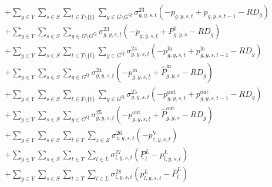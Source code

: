 \documentclass{article}
\newcommand{\sGenerators}{G}
\newcommand{\sStorage}{G^{\mathrm{Q}}}
\newcommand{\sYears}{Y}
\newcommand{\sScenarios}{S}
\newcommand{\sIntervals}{T}
\newcommand{\sZones}{Z}
\newcommand{\sLinks}{L}
\newcommand{\iGenerator}{g}
\newcommand{\iYear}{y}
\newcommand{\iScenario}{s}
\newcommand{\iInterval}{t}
\newcommand{\iIntervalTerminal}{\overline{\iInterval}}
\newcommand{\iIntervalStart}{\underline{\iInterval}}
\newcommand{\iZone}{z}
\newcommand{\iLink}{l}
\newcommand{\cRampRateDown}[1][\iGenerator]{RD_{#1}}
\newcommand{\cPowerFlowMin}{\underline{P}_{\iLink}^{L}}
\newcommand{\cPowerFlowMax}{\overline{P}_{\iLink}^{L}}
\newcommand{\cPowerInitial}[1][\iGenerator,\iYear,\iScenario]{P_{#1}^{0}}
\newcommand{\cPowerOutInitial}[1][\iGenerator,\iYear,\iScenario]{\hat{P}_{#1}^{\mathrm{out}}}
\newcommand{\cPowerInInitial}[1][\iGenerator,\iYear,\iScenario]{\hat{P}_{#1}^{\mathrm{in}}}
\newcommand{\vPower}[1][\iGenerator,\iYear,\iScenario,\iInterval]{p_{#1}}
\newcommand{\vPowerIn}[1][\iGenerator,\iYear,\iScenario,\iInterval]{p^{\mathrm{in}}_{#1}}
\newcommand{\vPowerOut}[1][\iGenerator,\iYear,\iScenario,\iInterval]{p^{\mathrm{out}}_{#1}}
\newcommand{\vPowerFlow}[1][\iLink,\iYear,\iScenario,\iInterval]{p^{\sLinks}_{#1}}
\newcommand{\vLostLoadPower}[1][\iZone,\iYear,\iScenario,\iInterval]{p^{\mathrm{V}}_{#1}}
\newcommand{\dRampRateDown}[1][\iGenerator,\iYear,\iScenario,\iInterval]{\sigma_{#1}^{23}}
\newcommand{\dRampRateDownStorageCharging}[1][\iGenerator,\iYear,\iScenario,\iInterval]{\sigma_{#1}^{24}}
\newcommand{\dRampRateDownStorageDischarging}[1][\iGenerator,\iYear,\iScenario,\iInterval]{\sigma_{#1}^{25}}
\newcommand{\dNonNegativeLostLoad}[1][\iZone,\iYear,\iScenario,\iInterval]{\sigma_{#1}^{26}}
\newcommand{\dMinPowerFlow}[1][\iLink,\iYear,\iScenario,\iInterval]{\sigma_{#1}^{27}}
\newcommand{\dMaxPowerFlow}[1][\iLink,\iYear,\iScenario,\iInterval]{\sigma_{#1}^{28}}
\begin{document}
\begin{align}
		& + \sum\limits_{\iYear \in \sYears}\sum\limits_{\iScenario \in \sScenarios}\sum\limits_{\iInterval \in \sIntervals \setminus \{\iIntervalStart\}} \sum\limits_{\iGenerator \in \sGenerators \setminus \sStorage} \dRampRateDown \left(- \vPower + \vPower[\iGenerator,\iYear,\iScenario,\iInterval-1] - \cRampRateDown\right)\\
		& + \sum\limits_{\iYear \in \sYears}\sum\limits_{\iScenario \in \sScenarios} \sum\limits_{\iGenerator \in \sGenerators \setminus \sStorage} \dRampRateDown[\iGenerator,\iYear,\iScenario,\iIntervalStart] \left(- \vPower[\iGenerator,\iYear,\iScenario,\iIntervalStart] + \cPowerInitial - \cRampRateDown\right)\\
		& +  \sum\limits_{\iYear \in \sYears}\sum\limits_{\iScenario \in \sScenarios} \sum\limits_{\iInterval \in \sIntervals \setminus \{\iIntervalTerminal\}} \sum\limits_{\iGenerator \in \sStorage} \dRampRateDownStorageCharging \left(- \vPowerIn + \vPowerIn[\iGenerator,\iYear,\iScenario,\iInterval-1] - \cRampRateDown\right) \\
		& +  \sum\limits_{\iYear \in \sYears}\sum\limits_{\iScenario \in \sScenarios} \sum\limits_{\iGenerator \in \sStorage} \dRampRateDownStorageCharging[\iGenerator,\iYear,\iScenario,\iIntervalStart] \left(- \vPowerIn[\iGenerator,\iYear,\iScenario,\iIntervalStart] + \cPowerInInitial - \cRampRateDown\right) \\
		& +  \sum\limits_{\iYear \in \sYears}\sum\limits_{\iScenario \in \sScenarios} \sum\limits_{\iInterval \in \sIntervals \setminus \{\iIntervalTerminal\}} \sum\limits_{\iGenerator \in \sStorage} \dRampRateDownStorageDischarging \left(- \vPowerOut + \vPowerOut[\iGenerator,\iYear,\iScenario,\iInterval-1] - \cRampRateDown\right) \\
		& +  \sum\limits_{\iYear \in \sYears}\sum\limits_{\iScenario \in \sScenarios} \sum\limits_{\iGenerator \in \sStorage} \dRampRateDownStorageDischarging[\iGenerator,\iYear,\iScenario,\iIntervalStart] \left(- \vPowerOut[\iGenerator,\iYear,\iScenario,\iIntervalStart] + \cPowerOutInitial - \cRampRateDown\right) \\
		& + \sum\limits_{\iYear \in \sYears}\sum\limits_{\iScenario \in \sScenarios}\sum\limits_{\iInterval \in \sIntervals} \sum\limits_{\iZone \in \sZones} \dNonNegativeLostLoad \left(- \vLostLoadPower\right)\\
		& + \sum\limits_{\iYear \in \sYears}\sum\limits_{\iScenario \in \sScenarios}\sum\limits_{\iInterval \in \sIntervals} \sum\limits_{\iLink \in \sLinks} \dMinPowerFlow \left(\cPowerFlowMin - \vPowerFlow\right)\\
		& + \sum\limits_{\iYear \in \sYears}\sum\limits_{\iScenario \in \sScenarios}\sum\limits_{\iInterval \in \sIntervals} \sum\limits_{\iLink \in \sLinks} \dMaxPowerFlow \left(\vPowerFlow - \cPowerFlowMax\right)\\\nonumber
\end{align}
\end{document}
